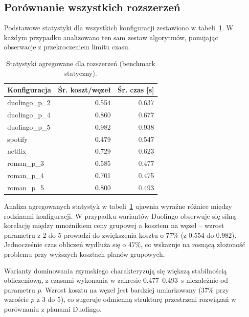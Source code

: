\subsection{Porównanie wszystkich rozszerzeń}

Podstawowe statystyki dla wszystkich konfiguracji zestawiono w tabeli~\ref{tab:ext-overall-static}. W każdym przypadku analizowano ten sam zestaw algorytmów, pomijając obserwacje z przekroczeniem limitu czasu.

\begin{table}[H]
  \centering
  \caption{Statystyki agregowane dla rozszerzeń (benchmark statyczny).}
  \label{tab:ext-overall-static}
  \begin{tabular}{lrr}
    \toprule
    \textbf{Konfiguracja} & \textbf{Śr. koszt/węzeł} & \textbf{Śr. czas [s]} \\
    \midrule
    duolingo\_p\_2        & 0.554                    & 0.637                 \\
    duolingo\_p\_4        & 0.860                    & 0.677                 \\
    duolingo\_p\_5        & 0.982                    & 0.938                 \\
    spotify               & 0.479                    & 0.547                 \\
    netflix               & 0.729                    & 0.623                 \\
    roman\_p\_3           & 0.585                    & 0.477                 \\
    roman\_p\_4           & 0.701                    & 0.475                 \\
    roman\_p\_5           & 0.800                    & 0.493                 \\
  \end{tabular}
\end{table}

Analiza agregowanych statystyk w tabeli~\ref{tab:ext-overall-static} ujawnia wyraźne różnice między rodzinami konfiguracji. W przypadku wariantów Duolingo obserwuje się silną korelację między mnożnikiem ceny grupowej a kosztem na węzeł -- wzrost parametru z 2 do 5 prowadzi do zwiększenia kosztu o 77\% (z 0.554 do 0.982). Jednocześnie czas obliczeń wydłuża się o 47\%, co wskazuje na rosnącą złożoność problemu przy wyższych kosztach planów grupowych.

Warianty dominowania rzymskiego charakteryzują się większą stabilnością obliczeniową, z czasami wykonania w zakresie 0.477--0.493~s niezależnie od parametru $p$. Wzrost kosztu na węzeł jest bardziej umiarkowany (37\% przy wzroście $p$ z 3 do 5), co sugeruje odmienną strukturę przestrzeni rozwiązań w porównaniu z planami Duolingo.

